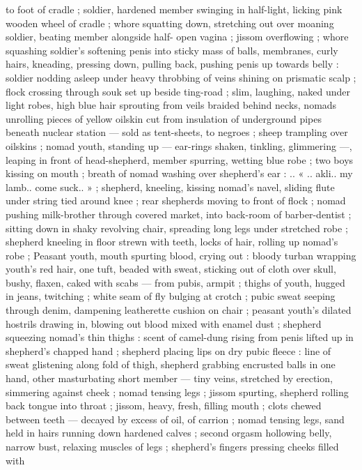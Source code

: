 to foot of cradle ; soldier, hardened member swinging in half-light,
licking pink wooden wheel of cradle ; whore squatting down,
stretching out over moaning soldier, beating member alongside half-
open vagina ; jissom overflowing ; whore squashing soldier's
softening penis into sticky mass of balls, membranes, curly hairs,
kneading, pressing down, pulling back, pushing penis up towards
belly : soldier nodding asleep under heavy throbbing of veins
shining on prismatic scalp ; flock crossing through souk set up beside
ting-road ; slim, laughing, naked under light robes, high blue hair
sprouting from veils braided behind necks, nomads unrolling pieces
of yellow oilskin cut from insulation of underground pipes beneath
nuclear station --- sold as tent-sheets, to negroes ; sheep trampling
over oilskins ; nomad youth, standing up --- ear-rings shaken,
tinkling, glimmering ---, leaping in front of head-shepherd, member
spurring, wetting blue robe ; two boys kissing on mouth ; breath of
nomad washing over shepherd's ear : .. « .. akli.. my lamb.. come
suck.. » ; shepherd, kneeling, kissing nomad's navel, sliding flute
under string tied around knee ; rear shepherds moving to front of
flock ; nomad pushing milk-brother through covered market, into
back-room of barber-dentist ; sitting down in shaky revolving chair,
spreading long legs under stretched robe ; shepherd kneeling in
floor strewn with teeth, locks of hair, rolling up nomad's robe ;
Peasant youth, mouth spurting blood, crying out : bloody turban
wrapping youth's red hair, one tuft, beaded with sweat, sticking out
of cloth over skull, bushy, flaxen, caked with scabs --- from pubis,
armpit ; thighs of youth, hugged in jeans, twitching ; white seam of
fly bulging at crotch ; pubic sweat seeping through denim,
dampening leatherette cushion on chair ; peasant youth's dilated
hostrils drawing in, blowing out blood mixed with enamel dust ;
shepherd squeezing nomad's thin thighs : scent of camel-dung rising
from penis lifted up in shepherd's chapped hand ; shepherd placing
lips on dry pubic fleece : line of sweat glistening along fold of thigh, %
shepherd grabbing encrusted balls in one hand, other masturbating
short member --- tiny veins, stretched by erection, simmering
against cheek ; nomad tensing legs ; jissom spurting, shepherd
rolling back tongue into throat ; jissom, heavy, fresh, filling mouth ;
clots chewed between teeth --- decayed by excess of oil, of carrion
; nomad tensing legs, sand held in hairs running down hardened
calves ; second orgasm hollowing belly, narrow bust, relaxing
muscles of legs ; shepherd's fingers pressing cheeks filled with
